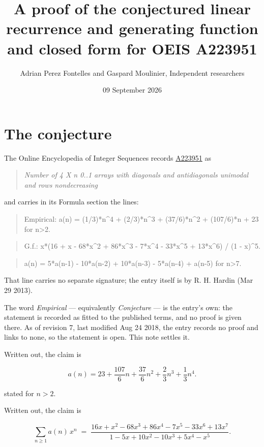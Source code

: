 \documentclass[11pt]{article}
\title{A proof of the conjectured linear recurrence and generating function and closed form for OEIS A223951}
\author{Adrian Perez Fontelles and Gaspard Moulinier, Independent researchers}
\date{09 September 2026}
\theoremstyle{definition}
\begin{document}
\maketitle
\section{The conjecture}

The Online Encyclopedia of Integer Sequences records \href{https://oeis.org/A223951}{A223951} as

\begin{quote}\itshape Number of 4 X n 0..1 arrays with diagonals and antidiagonals unimodal and rows nondecreasing\end{quote}

and carries in its Formula section the lines:

\begin{quote}\ttfamily Empirical: a(n) = (1/3)*n\textasciicircum{}4 + (2/3)*n\textasciicircum{}3 + (37/6)*n\textasciicircum{}2 + (107/6)*n + 23 for n>2.\end{quote}

\begin{quote}\ttfamily G.f.: x*(16 + x - 68*x\textasciicircum{}2 + 86*x\textasciicircum{}3 - 7*x\textasciicircum{}4 - 33*x\textasciicircum{}5 + 13*x\textasciicircum{}6) / (1 - x)\textasciicircum{}5.\end{quote}

\begin{quote}\ttfamily a(n) = 5*a(n-1) - 10*a(n-2) + 10*a(n-3) - 5*a(n-4) + a(n-5) for n>7.\end{quote}

That line carries no separate signature; the entry itself is by R. H. Hardin (Mar 29 2013).

The word {\itshape Empirical} --- equivalently {\itshape Conjecture} --- is the entry's own: the statement is recorded as fitted to the published terms, and no proof is given there. As of revision 7, last modified Aug 24 2018, the entry records no proof and links to none, so the statement is open. This note settles it.

Written out, the claim is

\[a(n) = 23 + \frac{107}{6}n + \frac{37}{6}n^{2} + \frac{2}{3}n^{3} + \frac{1}{3}n^{4}.\]

stated for $n > 2$.

Written out, the claim is

\[\sum_{n \ge 1} a(n)\,x^n \;=\; \frac{16x + x^{2} - 68x^{3} + 86x^{4} - 7x^{5} - 33x^{6} + 13x^{7}}{1 - 5x + 10x^{2} - 10x^{3} + 5x^{4} - x^{5}}.\]
\end{document}

